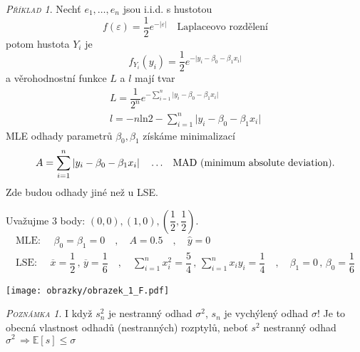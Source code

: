 \documentclass[oneside,intlimits,reqno]{scrbook}
\renewcommand{\epsilon}{\varepsilon}
\theoremstyle{definition}
\theoremstyle{plain}
\theoremstyle{remark}
\newtheorem{example}[define]{\textsc{Příklad}}
\newtheorem{remark}[define]{\textsc{Poznámka}}
\begin{document}
\begin{example}
Nechť $ e_{1}, \dots , e_{n} $ jsou i.i.d. s hustotou
\begin{equation*}
  f(\epsilon) = \dfrac{1}{2} e ^{- \vert \epsilon \vert} \quad \text{Laplaceovo rozdělení}
\end{equation*}
potom hustota $ Y_{i} $ je 
\begin{equation*}
  f_{Y_{i}}(y_{i}) = \dfrac{1}{2} e ^{- \vert y_{i} - \beta_{0} - \beta_{1} x_{i} \vert} 
\end{equation*}
a věrohodnostní funkce $ L $ a $  l$ mají tvar
\begin{equation*}
\begin{aligned}
  L = \dfrac{1}{2^{n}} e ^{- \sum_{i=1}^{n} \vert y_{i} - \beta_{0} - \beta_{1} x_{i} \vert}  \\
  l = -n \text{ln} 2 - \sum_{i=1}^{n} \vert y_{i} - \beta_{0} - \beta_{1} x_{i} \vert 
\end{aligned} 
\end{equation*}
MLE odhady parametrů $ \beta_{0} , \beta_{1} $ získáme minimalizací
\begin{equation}
A = \sum_{i=1}^{n} \vert y_{i} - \beta_{0} - \beta_{1} x_{i} \vert \quad \dots \text{ \, MAD (minimum absolute deviation).}
\end{equation}
Zde budou odhady jiné než u LSE.

Uvažujme 3 body: $ (0,0) , (1,0) , (\dfrac{1}{2},\dfrac{1}{2}) $.
\begin{equation}
\begin{aligned}
\text{MLE: } \quad  \beta_{0} = \beta_{1} = 0 \quad , \quad A = 0.5
 \quad , \quad \widehat{y} = 0 \\
 \text{LSE: } \quad \overline{x} = \dfrac{1}{2} \, , \, \overline{y} = \dfrac{1}{6} \quad , \quad \sum_{i=1}^{n} x_{i}^{2} = \dfrac{5}{4} \, , \, \sum_{i=1}^{n} x_{i} y_{i} = \dfrac{1}{4} \quad , \quad \beta_{1} = 0 \, , \, \beta_{0} = \dfrac{1}{6}
  \end{aligned}  
\end{equation}
\begin{center}
    \texttt{[image: obrazky/obrazek\_1\_F.pdf]}
\end{center}

\end{example}


\begin{remark}
I když $ s^{2}_{n} $ je nestranný odhad $ \sigma^{2} $, $ s_{n} $ je vychýlený odhad $ \sigma $!
Je to obecná vlastnost odhadů (nestranných) rozptylů, neboť $ s^{2} $ nestranný odhad $ \sigma^{2} \, \Rightarrow \mathbb{E}[s] \leq \sigma $ 
\end{remark}
\end{document}
